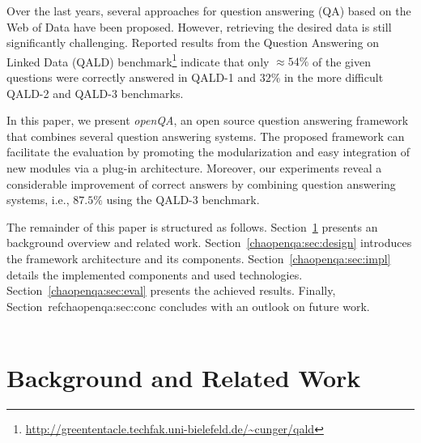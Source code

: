 Over the last years, several approaches for question answering (QA) based on the Web of Data have been proposed. 
However, retrieving the desired data is still significantly challenging.
Reported results from the Question Answering on Linked Data (QALD) benchmark\footnote{\url{http://greententacle.techfak.uni-bielefeld.de/~cunger/qald}} indicate that  only $\approx54\%$ of the given questions were correctly answered in QALD-1 and $32\%$ in the more difficult QALD-2 and QALD-3 benchmarks.

In this paper, we present \emph{openQA}, an open source question answering framework that combines several question answering systems.
The proposed framework can facilitate the evaluation by promoting the modularization and easy integration of new modules via a plug-in architecture. 
Moreover, our experiments reveal a considerable improvement of correct answers by combining question answering systems, i.e., $87.5\%$ using the QALD-3 benchmark.

The remainder of this paper is structured as follows.
Section~\ref{chaopenqa:sec:rel} presents an background overview and related work.
Section~\ref{chaopenqa:sec:design} introduces the framework architecture and its components.
Section~\ref{chaopenqa:sec:impl} details the implemented components and used technologies.
Section~\ref{chaopenqa:sec:eval} presents the achieved results.
Finally, Section~ref{chaopenqa:sec:conc} concludes with an outlook on future work.
\\\\
\section{Background and Related Work}\label{chaopenqa:sec:rel}

